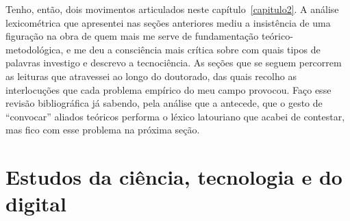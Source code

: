 Tenho, então, dois movimentos articulados neste capítulo~\ref{capitulo2}. A análise lexicométrica que apresentei nas seções anteriores mediu a insistência de uma figuração na obra de quem mais me serve de fundamentação teórico-metodológica, e me deu a consciência mais crítica sobre com quais tipos de palavras investigo e descrevo a tecnociência. As seções que se seguem percorrem as leituras que atravessei ao longo do doutorado, das quais recolho as interlocuções que cada problema empírico do meu campo provocou. Faço esse revisão bibliográfica já sabendo, pela análise que a antecede, que o gesto de \enquote{convocar} aliados teóricos performa o léxico latouriano que acabei de contestar, mas fico com esse problema na próxima seção.

\section{Estudos da ciência, tecnologia e do digital}
\label{sec:estudos_ciencia_tecnologia}

